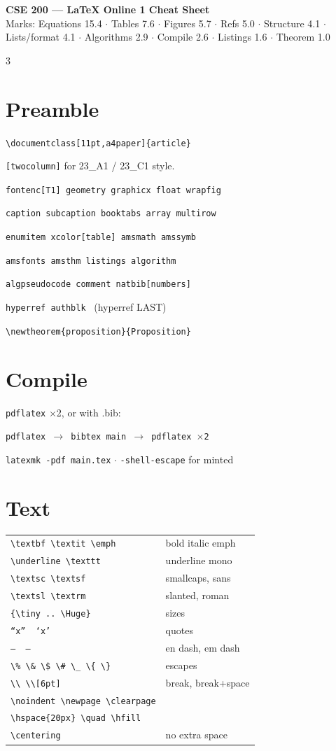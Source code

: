 \documentclass[a4paper]{article}
\makeatletter
\newcommand{\C}[1]{\texttt{\footnotesize #1}}
\newenvironment{rows}{\vspace{1pt}\begin{tabular}{@{}>{\raggedright\arraybackslash}p{3.35cm}@{}>{\raggedright\arraybackslash}p{2.4cm}@{}}}{\end{tabular}\vspace{2pt}\par}
\newcommand{\R}[2]{\C{#1} & #2 \\}
\makeatother
\begin{document}
{\footnotesize
\begin{center}
{\normalsize\bfseries\color{hdr} CSE 200 --- LaTeX Online 1 Cheat Sheet}\\[1pt]
{\tiny Marks: Equations 15.4 $\cdot$ Tables 7.6 $\cdot$ Figures 5.7 $\cdot$ Refs 5.0 $\cdot$ Structure 4.1 $\cdot$ Lists/format 4.1 $\cdot$ Algorithms 2.9 $\cdot$ Compile 2.6 $\cdot$ Listings 1.6 $\cdot$ Theorem 1.0}
\end{center}
\vspace{-4pt}
\begin{multicols}{3}
\raggedright

\section{Preamble}
\C{\textbackslash documentclass[11pt,a4paper]\{article\}}\par
\C{[twocolumn]} for 23\_A1 / 23\_C1 style.\par
\C{fontenc[T1] geometry graphicx float wrapfig}\par
\C{caption subcaption booktabs array multirow}\par
\C{enumitem xcolor[table] amsmath amssymb}\par
\C{amsfonts amsthm listings algorithm}\par
\C{algpseudocode comment natbib[numbers]}\par
\C{hyperref authblk} \ (hyperref LAST)\par
\C{\textbackslash newtheorem\{proposition\}\{Proposition\}}

\section{Compile}
\C{pdflatex} $\times$2, or with .bib:\par
\C{pdflatex $\to$ bibtex main $\to$ pdflatex $\times$2}\par
\C{latexmk -pdf main.tex} $\cdot$ \C{-shell-escape} for minted

\section{Text}
\begin{rows}
\R{\textbackslash textbf \textbackslash textit \textbackslash emph}{bold italic emph}
\R{\textbackslash underline \textbackslash texttt}{underline mono}
\R{\textbackslash textsc \textbackslash textsf}{smallcaps, sans}
\R{\textbackslash textsl \textbackslash textrm}{slanted, roman}
\R{\{\textbackslash tiny .. \textbackslash Huge\}}{10 sizes}
\R{``x'' \ `x'}{quotes}
\R{-- \ ---}{en dash, em dash}
\R{\textbackslash\% \textbackslash\& \textbackslash\$ \textbackslash\# \textbackslash\_ \textbackslash\{ \textbackslash\}}{escapes}
\R{\textbackslash\textbackslash \ \textbackslash\textbackslash[6pt]}{break, break+space}
\R{\textbackslash noindent \textbackslash newpage \textbackslash clearpage}{}
\R{\textbackslash hspace\{20px\} \textbackslash quad \textbackslash hfill}{}
\R{\textbackslash centering}{no extra space}
\end{rows}


\end{multicols}}
\end{document}
